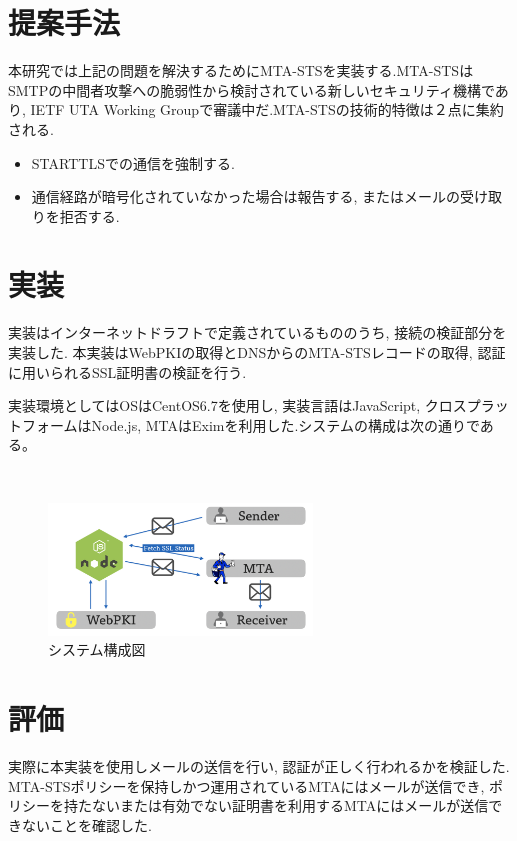\documentclass[a4j, 10pt, uplatex]{jsarticle}
\begin{document}
\section{提案手法}

本研究では上記の問題を解決するためにMTA-STSを実装する.MTA-STSはSMTPの中間者攻撃への脆弱性から検討されている新しいセキュリティ機構であり, IETF UTA Working Groupで審議中だ.\cite{draft}MTA-STSの技術的特徴は２点に集約される.

\begin{itemize}
\item STARTTLSでの通信を強制する.
\item 通信経路が暗号化されていなかった場合は報告する, またはメールの受け取りを拒否する.
\end{itemize}

\section{実装}

実装はインターネットドラフトで定義されているもののうち, 接続の検証部分を実装した. 本実装はWebPKIの取得とDNSからのMTA-STSレコードの取得, 認証に用いられるSSL証明書の検証を行う.

実装環境としてはOSはCentOS6.7を使用し, 実装言語はJavaScript, クロスプラットフォームはNode.js, MTAはEximを利用した.システムの構成は次の通りである。

\begin{figure}[htbp]
　\begin{center}
      \includegraphics[width=7cm]{system.png}
      \caption{システム構成図}
    \end{center}
\end{figure}

\section{評価}

実際に本実装を使用しメールの送信を行い, 認証が正しく行われるかを検証した. MTA-STSポリシーを保持しかつ運用されているMTAにはメールが送信でき, ポリシーを持たないまたは有効でない証明書を利用するMTAにはメールが送信できないことを確認した.
\end{document}
